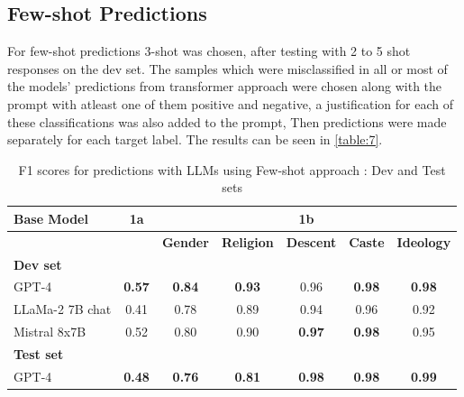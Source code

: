 \documentclass[10pt, a4paper]{article}
\begin{document}
\subsection{Few-shot Predictions}

For few-shot predictions 3-shot was chosen, after testing with 2 to 5 shot responses on the dev set. The samples which were misclassified in all or most of the models' predictions from transformer approach were chosen along with the prompt with atleast one of them positive and negative, a justification for each of these classifications was also added to the prompt, Then predictions were made separately for each target label. The results can be seen in \autoref{table:7}.  

\begin{table}[h!]
\begin{center}
\begin{tabular}{|l|c|c|c|c|c|c|}
\hline
\textbf{Base Model} & \textbf{1a} & \multicolumn{5}{c|}{\textbf{1b}} \\
\hline
 & & \textbf{Gender} & \textbf{Religion} & \textbf{Descent} & \textbf{Caste} & \textbf{Ideology} \\
\hline
\textbf{Dev set} & \multicolumn{6}{c|}{\textbf{}} \\
\hline
GPT-4 & \textbf{0.57} & \textbf{0.84} & \textbf{0.93} & 0.96 & \textbf{0.98} & \textbf{0.98} \\
\hline
LLaMa-2 7B chat & 0.41 & 0.78 & 0.89 & 0.94 & 0.96 & 0.92 \\
\hline
Mistral 8x7B & 0.52 & 0.80 & 0.90 & \textbf{0.97} & \textbf{0.98} & 0.95 \\
\hline
\textbf{Test set} & \multicolumn{6}{c|}{\textbf{}} \\
\hline
GPT-4 & \textbf{0.48} & \textbf{0.76} & \textbf{0.81} & \textbf{0.98} & \textbf{0.98} & \textbf{0.99} \\
\hline
\end{tabular}
\caption{F1 scores for predictions with LLMs using Few-shot approach : Dev and Test sets}
\label{table:7}
\end{center}
\end{table}
\end{document}
